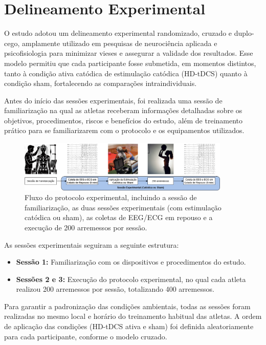 \section{Delineamento Experimental}

O estudo adotou um delineamento experimental randomizado, cruzado e duplo-cego, amplamente utilizado em pesquisas de neurociência aplicada e psicofisiologia para minimizar vieses e assegurar a validade dos resultados. Esse modelo permitiu que cada participante fosse submetida, em momentos distintos, tanto à condição ativa catódica de estimulação catódica (HD-tDCS) quanto à condição sham, fortalecendo as comparações intraindividuais.

Antes do início das sessões experimentais, foi realizada uma sessão de familiarização na qual as atletas receberam informações detalhadas sobre os objetivos, procedimentos, riscos e benefícios do estudo, além de treinamento prático para se familiarizarem com o protocolo e os equipamentos utilizados.

\begin{figure}[htb]
    \centering
    \includegraphics[width=0.9\textwidth]{figs/0_intro_e_desenho_experimental/desenho_experimental_drawio.png}
    \caption{Fluxo do protocolo experimental, incluindo a sessão de familiarização, as duas sessões experimentais (com estimulação catódica ou sham), as coletas de EEG/ECG em repouso e a execução de 200 arremessos por sessão.}
    \label{fig:desenho_experimental}
\end{figure}

As sessões experimentais seguiram a seguinte estrutura:
\begin{itemize}
    \item \textbf{Sessão 1:} Familiarização com os dispositivos e procedimentos do estudo.
    \item \textbf{Sessões 2 e 3:} Execução do protocolo experimental, no qual cada atleta realizou 200 arremessos por sessão, totalizando 400 arremessos.
\end{itemize}

Para garantir a padronização das condições ambientais, todas as sessões foram realizadas no mesmo local e horário do treinamento habitual das atletas. A ordem de aplicação das condições (HD-tDCS ativa e sham) foi definida aleatoriamente para cada participante, conforme o modelo cruzado.

